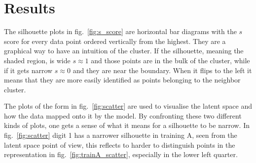\documentclass[twocolumn,gsifonts,twoside]{gsipaper}
\begin{document}
\section{Results}
The silhouette plots in fig.~\ref{fig:s_score} are horizontal bar diagrams with the $s$ score for every data point ordered vertically from the highest. They are a graphical way to have an intuition of the cluster. If the silhouette, meaning the shaded region, is wide $s\approx1$ and those points are in the bulk of the cluster, while if it gets narrow $s\approx0$ and they are near the boundary. When it flips to the left it means that they are more easily identified as points belonging to the neighbor cluster.

The plots of the form in fig.~\ref{fig:scatter} are used to visualise the latent space and how the data mapped onto it by the model. By confronting these two different kinds of plots, one gets a sense of what it means for a silhouette to be narrow. In fig.~\ref{fig:scatter} digit 1 has a narrower silhouette in training A, seen from the latent space point of view, this reflects to harder to distinguish points in the representation in fig.~\ref{fig:trainA_scatter}, especially in the lower left quarter.
\end{document}
